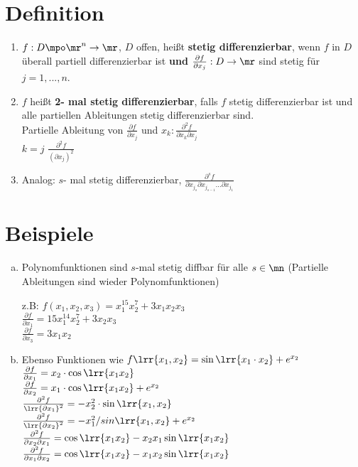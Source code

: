 \section{Definition}
	\begin{enumerate}
		\item $ f: D\mpo\mr^n\rightarrow\mr $, $ D $ offen, heißt \textbf{stetig differenzierbar}, wenn $ f $ in $ D $ überall partiell differenzierbar ist \textbf{und} $ \frac{\partial f}{\partial x_j}:D\rightarrow\mr $ sind stetig für $ j=1,...,n $.
		
		\item  $ f $ heißt \textbf{2- mal stetig differenzierbar}, falls $ f $ stetig differenzierbar ist und alle partiellen Ableitungen stetig differenzierbar sind.\\
		Partielle Ableitung von $ \frac{\partial f}{\partial x_j} $ und $ x_k:\frac{\partial^2 f}{\partial x_k\partial x_j} $\\
		$ k=j $ $ \frac{\partial^2 f}{(\partial x_j)^2} $
		
		\item Analog: $ s $- mal stetig differenzierbar, $ \frac{\partial^s f}{\partial x_{j_{s}}\partial x_{j_{s-1}}...\partial x_{j_{1}}} $
	\end{enumerate}
	
\section{Beispiele}
	\begin{enumerate}[a)]
		\item Polynomfunktionen sind $s$-mal stetig diffbar für alle $s\in\mn$ (Partielle Ableitungen sind wieder Polynomfunktionen)
			
			z.B: $f(x_1,x_2,x_3)=x_1^{15}x_2^7+3x_1x_2x_3$\\
			$\frac{\partial f}{\partial x_1} = 15x_1^{14}x_2^7+3x_2x_3$\\
			$\frac{\partial f}{\partial x_3} = 3x_1x_2$
		\item Ebenso Funktionen wie $f\lrr{x_1,x_2} = \sin\lrr{x_1\cdot x_2}+e^{x_2}$\\
			$\frac{\partial f}{\partial x_1} = x_2\cdot\cos\lrr{x_1x_2}$\\
			$\frac{\partial f}{\partial x_2} = x_1\cdot\cos\lrr{x_1x_2}+e^{x_2}$\\
			$\frac{\partial^2f}{\lrr{\partial x_1}^2} = -x_2^2\cdot\sin\lrr{x_1,x_2}$\\
			$\frac{\partial^2f}{\lrr{\partial x_2}^2} = -x_1^2/sin\lrr{x_1,x_2}+e^{x_2}$\\
			$\frac{\partial^2f}{\partial x_2\partial x_1} = \cos\lrr{x_1x_2}-x_2x_1\sin\lrr{x_1x_2}$\\
			$\frac{\partial^2f}{\partial x_1\partial x_2} = \cos\lrr{x_1x_2}-x_1x_2\sin\lrr{x_1x_2}$
	\end{enumerate}

